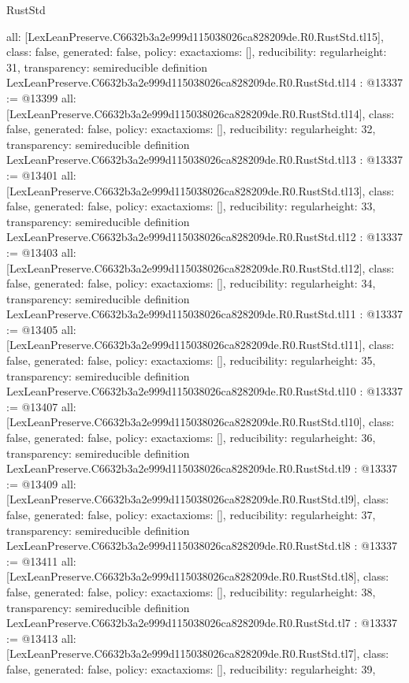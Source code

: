 \begin{lexlean}{RustStd}
\begin{coremodule}
{  all: [LexLeanPreserve.C6632b3a2e999d115038026ca828209de.R0.RustStd.tl15],
  class: false,
  generated: false,
  policy: exact{axioms: []},
  reducibility: regular{height: 31},
  transparency: semireducible
}
definition LexLeanPreserve.C6632b3a2e999d115038026ca828209de.R0.RustStd.tl14 : @13337 := @13399 {
  all: [LexLeanPreserve.C6632b3a2e999d115038026ca828209de.R0.RustStd.tl14],
  class: false,
  generated: false,
  policy: exact{axioms: []},
  reducibility: regular{height: 32},
  transparency: semireducible
}
definition LexLeanPreserve.C6632b3a2e999d115038026ca828209de.R0.RustStd.tl13 : @13337 := @13401 {
  all: [LexLeanPreserve.C6632b3a2e999d115038026ca828209de.R0.RustStd.tl13],
  class: false,
  generated: false,
  policy: exact{axioms: []},
  reducibility: regular{height: 33},
  transparency: semireducible
}
definition LexLeanPreserve.C6632b3a2e999d115038026ca828209de.R0.RustStd.tl12 : @13337 := @13403 {
  all: [LexLeanPreserve.C6632b3a2e999d115038026ca828209de.R0.RustStd.tl12],
  class: false,
  generated: false,
  policy: exact{axioms: []},
  reducibility: regular{height: 34},
  transparency: semireducible
}
definition LexLeanPreserve.C6632b3a2e999d115038026ca828209de.R0.RustStd.tl11 : @13337 := @13405 {
  all: [LexLeanPreserve.C6632b3a2e999d115038026ca828209de.R0.RustStd.tl11],
  class: false,
  generated: false,
  policy: exact{axioms: []},
  reducibility: regular{height: 35},
  transparency: semireducible
}
definition LexLeanPreserve.C6632b3a2e999d115038026ca828209de.R0.RustStd.tl10 : @13337 := @13407 {
  all: [LexLeanPreserve.C6632b3a2e999d115038026ca828209de.R0.RustStd.tl10],
  class: false,
  generated: false,
  policy: exact{axioms: []},
  reducibility: regular{height: 36},
  transparency: semireducible
}
definition LexLeanPreserve.C6632b3a2e999d115038026ca828209de.R0.RustStd.tl9 : @13337 := @13409 {
  all: [LexLeanPreserve.C6632b3a2e999d115038026ca828209de.R0.RustStd.tl9],
  class: false,
  generated: false,
  policy: exact{axioms: []},
  reducibility: regular{height: 37},
  transparency: semireducible
}
definition LexLeanPreserve.C6632b3a2e999d115038026ca828209de.R0.RustStd.tl8 : @13337 := @13411 {
  all: [LexLeanPreserve.C6632b3a2e999d115038026ca828209de.R0.RustStd.tl8],
  class: false,
  generated: false,
  policy: exact{axioms: []},
  reducibility: regular{height: 38},
  transparency: semireducible
}
definition LexLeanPreserve.C6632b3a2e999d115038026ca828209de.R0.RustStd.tl7 : @13337 := @13413 {
  all: [LexLeanPreserve.C6632b3a2e999d115038026ca828209de.R0.RustStd.tl7],
  class: false,
  generated: false,
  policy: exact{axioms: []},
  reducibility: regular{height: 39},
}
\end{coremodule}
\end{lexlean}

